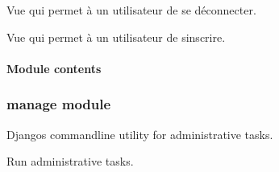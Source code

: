 \documentclass[letterpaper,10pt,english]{sphinxmanual}
\begin{document}
\begin{fulllineitems}
\label{\detokenize{accounts:accounts.views.logout_user}}
\pysigstartsignatures
{}
\pysigstopsignatures
\sphinxAtStartPar
Vue qui permet à un utilisateur de se déconnecter.

\end{fulllineitems}


\begin{fulllineitems}
\label{\detokenize{accounts:accounts.views.signup}}
\pysigstartsignatures
{}
\pysigstopsignatures
\sphinxAtStartPar
Vue qui permet à un utilisateur de s\textquotesingle{}inscrire.

\end{fulllineitems}



\paragraph{Module contents}
\label{\detokenize{accounts:module-accounts}}\label{\detokenize{accounts:module-contents}}
\sphinxstepscope


\subsubsection{manage module}
\label{\detokenize{manage:module-manage}}\label{\detokenize{manage:manage-module}}\label{\detokenize{manage::doc}}
\sphinxAtStartPar
Django\textquotesingle{}s command\sphinxhyphen{}line utility for administrative tasks.

\begin{fulllineitems}
\label{\detokenize{manage:manage.main}}
\pysigstartsignatures
{}
\pysigstopsignatures
\sphinxAtStartPar
Run administrative tasks.

\end{fulllineitems}
\end{document}
